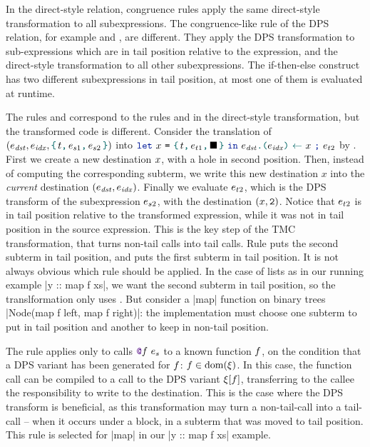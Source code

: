 In the direct-style relation, congruence rules apply the same direct-style transformation to all subexpressions. The congruence-like rule of the DPS relation, for example  and , are different. They apply the DPS transformation to sub-expressions which are in tail position relative to the expression, and the direct-style transformation to all other subexpressions. The if-then-else construct has two different subexpressions in tail position, at most one of them is evaluated at runtime.

The rules  and 
correspond to the rules  and  in the direct-style transformation, but the transformed code is different. Consider the translation of $
\left(
  \datalangExpr_\mathit{dst},
  \datalangExpr_\mathit{idx},
  \datalangBlock{\datalangTag}{\datalangExpr_{s1}}{\datalangExpr_{s2}}
\right)
$ into $
\datalangLet{\datalangVar}{\datalangBlock{\datalangTag}{\datalangExpr_{t1}}{\datalangHole}}{
  \datalangSeq{\datalangStore{\datalangExpr_\mathit{dst}}{\datalangExpr_\mathit{idx}}{\datalangVar}}{\datalangExpr_{t2}}}
$ by . First we create a new destination $\datalangVar$, with a hole in second position. Then, instead of computing the corresponding subterm, we write this new destination $x$ into the \emph{current} destination $({\datalangExpr_\mathit{dst}}, {\datalangExpr_\mathit{idx}})$. Finally we evaluate $\datalangExpr_{t2}$, which is the DPS transform of the subexpression $\datalangExpr_{s2}$, with the destination $(\datalangVar, \datalangTwo)$. Notice that $\datalangExpr_{t2}$ is in tail position relative to the transformed expression, while it was not in tail position in the source expression. This is the key step of the TMC transformation, that turns non-tail calls into tail calls. Rule  puts the second subterm in tail position, and  puts the first subterm in tail position. It is not always obvious which rule should be applied. In the case of lists as in our running example \ocaml|y :: map f xs|, we want the second subterm in tail position, so the translformation only uses . But consider a \ocaml|map| function on binary trees \ocaml|Node(map f left, map f right)|: the implementation must choose one subterm to put in tail position and another to keep in non-tail position.

The rule  applies only to calls $\datalangCall {\datalangFnptr \datalangFn} {\datalangExpr_s}$ to a known function $\datalangFn$, on the condition that a DPS variant has been generated for $\datalangFn$: $\datalangFn \in \dom{\datalangRenaming}$. In this case, the function call can be compiled to a call to the DPS variant $\datalangRenaming [\datalangFn]$, transferring to the callee the responsibility to write to the destination. This is the case where the DPS transform is beneficial, as this transformation may turn a non-tail-call into a tail-call -- when it occurs under a block, in a subterm that was moved to tail position. This rule is selected for \ocaml|map| in our \ocaml|y :: map f xs| example.


